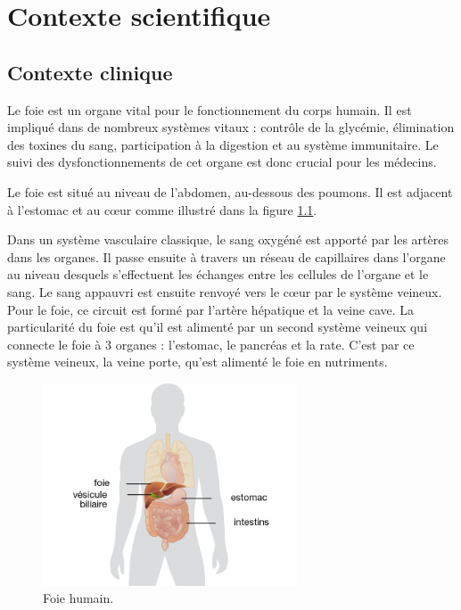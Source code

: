 %

\chapter{Contexte scientifique}
\label{sec:contexte}



\section{Contexte clinique}
\label{sec:contexte:clinique}

Le foie est un organe vital pour le fonctionnement du corps humain. Il est impliqué dans de nombreux systèmes vitaux : contrôle de la glycémie, élimination des toxines du sang, participation à la digestion et au système immunitaire. Le suivi des dysfonctionnements de cet organe est donc crucial pour les médecins.

Le foie est situé au niveau de l'abdomen, au-dessous des poumons. Il est adjacent à l'estomac et au cœur comme illustré dans la figure \ref{fig:liver}.

Dans un système vasculaire classique, le sang oxygéné est apporté par les artères dans les organes. Il passe ensuite à travers un réseau de capillaires dans l'organe au niveau desquels s'effectuent les échanges entre les cellules de l'organe et le sang. Le sang appauvri est ensuite renvoyé vers le cœur par le système veineux. Pour le foie, ce circuit est formé par l'artère hépatique et la veine cave. La particularité du foie est qu'il est alimenté par un second système veineux qui connecte le foie à 3 organes : l'estomac, le pancréas et la rate. C'est par ce système veineux, la veine porte, qu'est alimenté le foie en nutriments.  


\begin{figure}
    \centering
    \includegraphics[height=6cm]{Images/Liver.png}
    \caption{Foie humain.}
    \label{fig:liver}
\end{figure}

